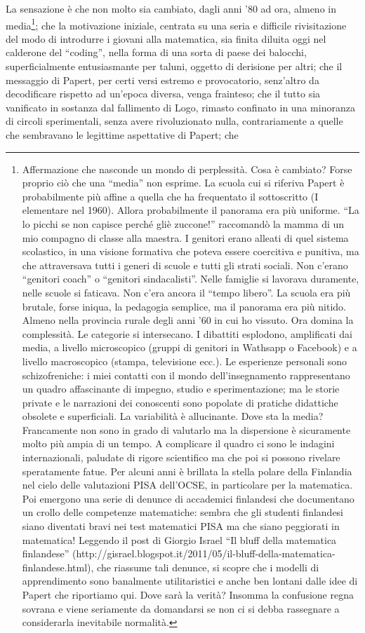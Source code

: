 La sensazione è che non molto sia cambiato, dagli anni '80 ad ora, almeno in media\footnote{Affermazione che nasconde un mondo di perplessità. Cosa è cambiato? Forse proprio ciò che una “media” non esprime. La scuola cui si riferiva Papert è probabilmente più affine a quella che ha frequentato il sottoscritto (I elementare nel 1960). Allora probabilmente il panorama era più uniforme. “La lo picchi se non capisce perché gliè zuccone!” raccomandò la mamma di un mio compagno di classe alla maestra. I genitori erano alleati di quel sistema scolastico, in una visione formativa che poteva essere coercitiva e punitiva, ma che attraversava tutti i generi di scuole e tutti gli strati sociali. Non c'erano “genitori coach” o “genitori sindacalisti”. Nelle famiglie si lavorava duramente, nelle scuole si faticava. Non c'era ancora il “tempo libero”. La scuola era più brutale, forse iniqua, la pedagogia semplice, ma il panorama era più nitido. Almeno nella provincia rurale degli anni '60 in cui ho vissuto. Ora domina la complessità. Le categorie si intersecano. I dibattiti esplodono, amplificati dai media, a livello microscopico (gruppi di genitori in Wathsapp o Facebook) e a livello macroscopico (stampa, televisione ecc.). Le esperienze personali sono schizofreniche: i miei contatti con il mondo dell'insegnamento rappresentano un quadro affascinante di impegno, studio e sperimentazione; ma le storie private e le narrazioni dei conoscenti sono popolate di pratiche didattiche obsolete e superficiali. La variabilità è allucinante. Dove sta la media? Francamente non sono in grado di valutarlo ma la dispersione è sicuramente molto più ampia di un tempo. A complicare il quadro ci sono le indagini internazionali, paludate di rigore scientifico ma che poi si possono rivelare speratamente fatue. Per alcuni anni è brillata la stella polare della Finlandia nel cielo delle valutazioni PISA dell'OCSE, in particolare per la matematica. Poi emergono una serie di denunce di accademici finlandesi che documentano un crollo delle competenze matematiche: sembra che gli studenti finlandesi siano diventati bravi nei test matematici PISA ma che siano peggiorati in matematica! Leggendo il post di Giorgio Israel “Il bluff della matematica finlandese” (http://gisrael.blogspot.it/2011/05/il-bluff-della-matematica-finlandese.html), che riassume tali denunce, si scopre che i modelli di apprendimento sono banalmente utilitaristici e anche ben lontani dalle idee di Papert che riportiamo qui. Dove sarà la verità? Insomma la confusione regna sovrana e viene seriamente da domandarsi se non ci si debba rassegnare a considerarla inevitabile normalità.}; che la motivazione iniziale, centrata su una seria e difficile rivisitazione del modo di introdurre i giovani alla matematica, sia finita diluita oggi nel calderone del “coding”, nella forma di una sorta di paese dei balocchi, superficialmente entusiasmante per taluni, oggetto di derisione per altri; che il messaggio di Papert, per certi versi estremo e provocatorio, senz'altro da decodificare rispetto ad un'epoca diversa, venga frainteso; che il tutto sia vanificato in sostanza dal fallimento di Logo, rimasto confinato in una minoranza di circoli sperimentali, senza avere rivoluzionato nulla, contrariamente a quelle che sembravano le legittime aspettative di Papert; che 